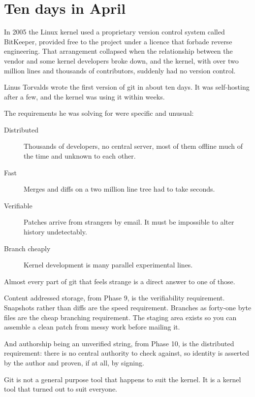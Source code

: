 \documentclass[11pt]{article}
\begin{document}
\maketitlepage

\section{Ten days in April}

In 2005 the Linux kernel used a proprietary version control system called BitKeeper,
provided free to the project under a licence that forbade reverse engineering. That
arrangement collapsed when the relationship between the vendor and some kernel
developers broke down, and the kernel, with over two million lines and thousands of
contributors, suddenly had no version control.

Linus Torvalds wrote the first version of git in about ten days. It was
self-hosting after a few, and the kernel was using it within weeks.

The requirements he was solving for were specific and unusual:

\begin{description}
  \item[Distributed] Thousands of developers, no central server, most of them
    offline much of the time and unknown to each other.
  \item[Fast] Merges and diffs on a two million line tree had to take seconds.
  \item[Verifiable] Patches arrive from strangers by email. It must be impossible to
    alter history undetectably.
  \item[Branch cheaply] Kernel development is many parallel experimental lines.
\end{description}

\begin{why}
Almost every part of git that feels strange is a direct answer to one of those.

Content addressed storage, from Phase 9, is the verifiability requirement. Snapshots
rather than diffs are the speed requirement. Branches as forty-one byte files are the
cheap branching requirement. The staging area exists so you can assemble a clean
patch from messy work before mailing it.

And authorship being an unverified string, from Phase 10, is the distributed
requirement: there is no central authority to check against, so identity is asserted
by the author and proven, if at all, by signing.

Git is not a general purpose tool that happens to suit the kernel. It is a kernel
tool that turned out to suit everyone.
\end{why}
\end{document}

